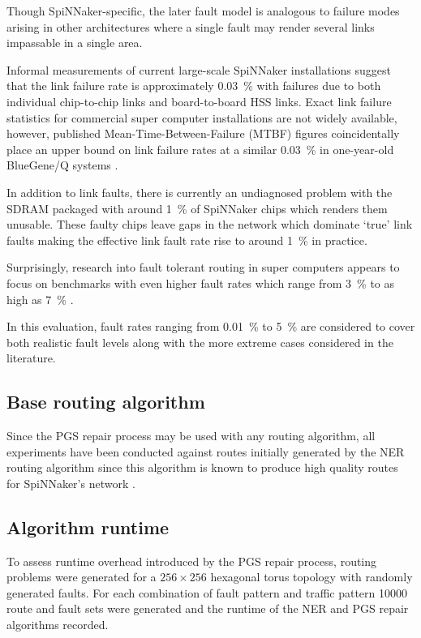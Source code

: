 			Though SpiNNaker-specific, the later fault model is analogous to failure
			modes arising in other architectures where a single fault may render
			several links impassable in a single area.
			
			Informal measurements of current large-scale SpiNNaker installations
			suggest that the link failure rate is approximately \SI{0.03}{\percent}
			with failures due to both individual chip-to-chip links and
			board-to-board HSS links. Exact link failure statistics for commercial
			super computer installations are not widely available, however, published
			Mean-Time-Between-Failure (MTBF) figures coincidentally place an upper
			bound on link failure rates at a similar \SI{0.03}{\percent} in
			one-year-old BlueGene/Q systems \cite{chiu11}.
			
			In addition to link faults, there is currently an undiagnosed problem
			with the SDRAM packaged with around \SI{1}{\percent} of SpiNNaker chips
			which renders them unusable. These faulty chips leave gaps in the network
			which dominate `true' link faults making the effective link fault rate
			rise to around \SI{1}{\percent} in practice.
			
			Surprisingly, research into fault tolerant routing in super computers
			appears to focus on benchmarks with even higher fault rates which range
			from \SI{3}{\percent} to as high as \SI{7}{\percent}
			\cite{ho04,gomez04,mejia06}.
			
			In this evaluation, fault rates ranging from \SI{0.01}{\percent} to
			\SI{5}{\percent} are considered to cover both realistic fault levels
			along with the more extreme cases considered in the literature.
		
		\subsection{Base routing algorithm}
			
			Since the PGS repair process may be used with any routing algorithm, all
			experiments have been conducted against routes initially generated by the
			NER routing algorithm since this algorithm is known to produce high
			quality routes for SpiNNaker's network \cite{navaridas14}.
			
		\subsection{Algorithm runtime}
			
			To assess runtime overhead introduced by the PGS repair process, routing
			problems were generated for a $256\times256$ hexagonal torus topology
			with randomly generated faults. For each combination of fault pattern and
			traffic pattern \num{10000} route and fault sets were generated and the
			runtime of the NER and PGS repair algorithms recorded.
			
